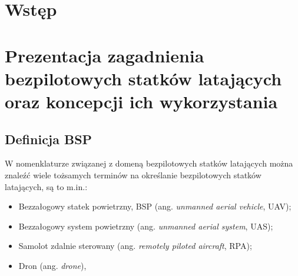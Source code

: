 

\newcommand{\kierunek}{INFORMATYKA}
\newcommand{\stopien}{STUDIA II$^{\mathrm{o}}$} %
\newcommand{\temat}{MOBILNY SYSTEM ZARZĄDZANIA I STEROWANIA BEZPILOTOWYM STATKIEM LATAJĄCYM}
\newcommand{\data}{Warszawa 2022}
\newcommand{\autor}{Norbert WASZKOWIAK}
\newcommand{\promotor}{dr inż. Michał DYK}
\newcommand{\zgoda}{TAK} %
\newcommand{\specjalnosc}{SYSTEMY INFORMATYCZNE}

\newcommand{\bibTitle}[1]{``#1''}




\inserttitlepage

\section*{Wstęp} 
    


\clearpage

\section{Prezentacja zagadnienia bezpilotowych statków latających oraz koncepcji ich wykorzystania}
\subsection{Definicja BSP}
W nomenklaturze związanej z domeną bezpilotowych statków latających można znaleźć wiele tożsamych terminów na określanie bezpilotowych statków latających, są to m.in.:
\begin{itemize}
  \setlength\itemsep{1mm} %
  \item Bezzałogowy statek powietrzny, BSP (ang. \textit{unmanned aerial vehicle}, UAV);
  \item Bezzałogowy system powietrzny (ang. \textit{unmanned aerial system}, UAS);
  \item Samolot zdalnie sterowany (ang. \textit{remotely piloted aircraft}, RPA);
  \item Dron (ang. \textit{drone}),
\end{itemize}

